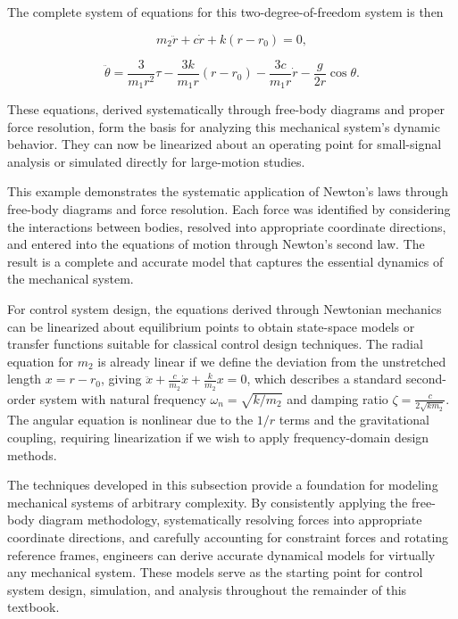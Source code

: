 \begin{example}
The complete system of equations for this two-degree-of-freedom system is then

\[
m_2\ddot{r} + c\dot{r} + k(r - r_0) = 0,
\]

\[
\ddot{\theta} = \frac{3}{m_1r^2}\tau - \frac{3k}{m_1r}(r - r_0) - \frac{3c}{m_1r}\dot{r} - \frac{g}{2r}\cos\theta.
\]

These equations, derived systematically through free-body diagrams and proper force resolution, form the basis for analyzing this mechanical system's dynamic behavior. They can now be linearized about an operating point for small-signal analysis or simulated directly for large-motion studies.
\end{example}

This example demonstrates the systematic application of Newton's laws through free-body diagrams and force resolution. Each force was identified by considering the interactions between bodies, resolved into appropriate coordinate directions, and entered into the equations of motion through Newton's second law. The result is a complete and accurate model that captures the essential dynamics of the mechanical system.

For control system design, the equations derived through Newtonian mechanics can be linearized about equilibrium points to obtain state-space models or transfer functions suitable for classical control design techniques. The radial equation for $m_2$ is already linear if we define the deviation from the unstretched length $x = r - r_0$, giving $\ddot{x} + \frac{c}{m_2}\dot{x} + \frac{k}{m_2}x = 0$, which describes a standard second-order system with natural frequency $\omega_n = \sqrt{k/m_2}$ and damping ratio $\zeta = \frac{c}{2\sqrt{km_2}}$. The angular equation is nonlinear due to the $1/r$ terms and the gravitational coupling, requiring linearization if we wish to apply frequency-domain design methods.

The techniques developed in this subsection provide a foundation for modeling mechanical systems of arbitrary complexity. By consistently applying the free-body diagram methodology, systematically resolving forces into appropriate coordinate directions, and carefully accounting for constraint forces and rotating reference frames, engineers can derive accurate dynamical models for virtually any mechanical system. These models serve as the starting point for control system design, simulation, and analysis throughout the remainder of this textbook.
